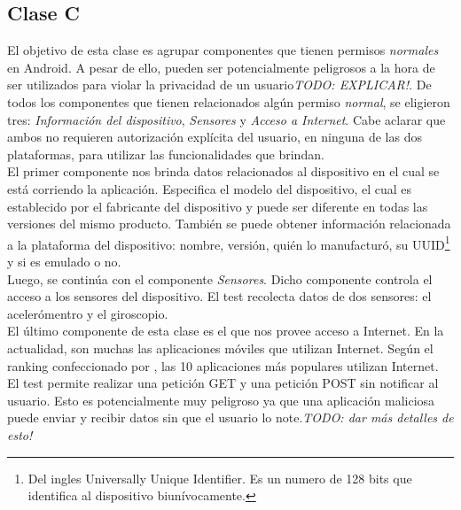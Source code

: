 \subsection{Clase C}
El objetivo de esta clase es agrupar componentes que tienen permisos \textit{normales} en Android. A pesar de ello, pueden ser potencialmente peligrosos a la hora de ser utilizados para violar la privacidad de un usuario\emph{TODO: EXPLICAR!}. De todos los componentes que tienen relacionados algún permiso \textit{normal}, se eligieron tres: \emph{Información del dispositivo}, \emph{Sensores} y \emph{Acceso a Internet}. Cabe aclarar que ambos no requieren autorización explícita del usuario, en ninguna de las dos plataformas, para utilizar las funcionalidades que brindan.\\
El primer componente nos brinda datos relacionados al dispositivo en el cual se está corriendo la aplicación. Especifica el modelo del dispositivo, el cual es establecido por el fabricante del dispositivo y puede ser diferente en todas las versiones del mismo producto. También se puede obtener información relacionada a la plataforma del dispositivo: nombre, versión, quién lo manufacturó, su UUID\footnote{Del ingles Universally Unique Identifier. Es un numero de 128 bits que identifica al dispositivo biunívocamente.} y si es emulado o no.\\
Luego, se continúa con el componente \emph{Sensores}. Dicho componente controla el acceso a los sensores del dispositivo. El test recolecta datos de dos sensores: el acelerómentro y el giroscopio.\\
El último componente de esta clase es el que nos provee acceso a Internet. En la actualidad, son muchas las aplicaciones móviles que utilizan Internet. Según el ranking confeccionado por \cite{BOA}, las 10 aplicaciones más populares utilizan Internet. El test permite realizar una petición GET y una petición POST sin notificar al usuario. Esto es potencialmente muy peligroso ya que una aplicación maliciosa puede enviar y recibir datos sin que el usuario lo note.\emph{TODO: dar más detalles de esto!}